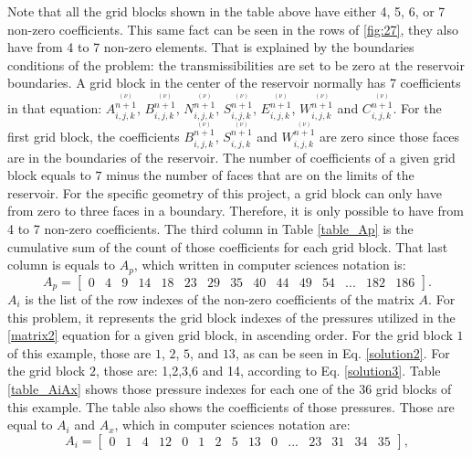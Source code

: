 \vspace{-5.5ex}
Note that all the grid blocks shown in the table above have either 4, 5, 6, or 7 non-zero coefficients. This same fact can be seen in the rows of \ref{fig:27}, they also have from 4 to 7 non-zero elements. That is explained by the boundaries conditions of the problem: the transmissibilities are set to be zero at the reservoir boundaries. A grid block in the center of the reservoir normally has 7 coefficients in that equation: $A^{\stackrel{(\nu)}{n+1}}_{i,j,k}$, $B^{\stackrel{(\nu)}{n+1}}_{i,j,k}$, $N^{\stackrel{(\nu)}{n+1}}_{i,j,k}$, $S^{\stackrel{(\nu)}{n+1}}_{i,j,k}$, $E^{\stackrel{(\nu)}{n+1}}_{i,j,k}$, $W^{\stackrel{(\nu)}{n+1}}_{i,j,k}$ and $C^{\stackrel{(\nu)}{n+1}}_{i,j,k}$.
For the first grid block, the coefficients $B^{\stackrel{(\nu)}{n+1}}_{i,j,k}$, $S^{\stackrel{(\nu)}{n+1}}_{i,j,k}$ and $W^{\stackrel{(\nu)}{n+1}}_{i,j,k}$ are zero since those faces are in the boundaries of the reservoir. The number of coefficients of a given grid block equals to $7$ minus the number of faces that are on the limits of the reservoir. For the specific geometry of this project, a grid block can only have from zero to three faces in a boundary. Therefore, it is only possible to have from 4 to 7 non-zero coefficients. The third column in Table \ref{table_Ap} is the cumulative sum of the count of those coefficients for each grid block. That last column is equals to $A_p$, which written in computer sciences notation is:
\begin{equation}
\label{Ap}
A_p = 
\begin{bmatrix}
0	&4	&9	&14	&18	&23	&29	&35 &40 &44 &49 &54 &... &182 &186
\end{bmatrix}
.
\end{equation}
$A_i$ is the list of the row indexes of the non-zero coefficients of the matrix $A$. For this problem, it represents the grid block indexes of the pressures utilized in the \ref{matrix2} equation for a given grid block, in ascending order. For the grid block $1$ of this example, those are $1$, $2$, $5$, and $13$, as can be seen in Eq. \ref{solution2}. For the grid block $2$, those are: 1,2,3,6 and 14, according to Eq. \ref{solution3}. Table \ref{table_AiAx} shows those pressure indexes for each one of the 36 grid blocks of this example. The table also shows the coefficients of those pressures. Those are equal to $A_i$ and $A_x$, which in computer sciences notation are:
\begin{equation}
\label{Ai}
A_i = 
\begin{bmatrix}
0	&1	&4	&12	&0	&1	&2	&5 &13 &0 &... &23 &31 &34 &35
\end{bmatrix}
,
\end{equation}

